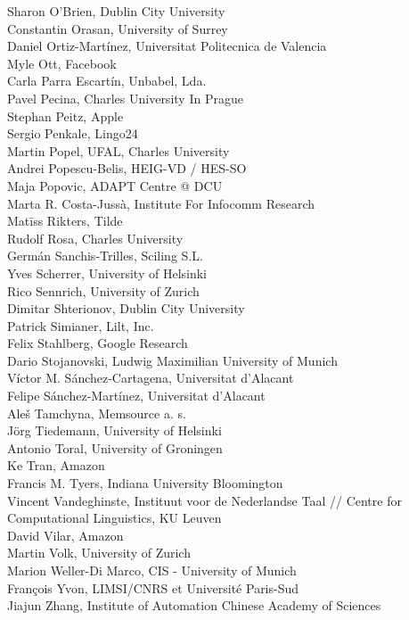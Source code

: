 \documentclass[a4paper,11pt,twoside]{book}
\begin{document}
\noindent Sharon O'Brien, Dublin City University\\
\noindent Constantin Orasan, University of Surrey\\
\noindent Daniel Ortiz-Martínez, Universitat Politecnica de Valencia\\
\noindent Myle Ott, Facebook\\
\noindent Carla Parra Escartín, Unbabel, Lda.\\
\noindent Pavel Pecina, Charles University In Prague\\
\noindent Stephan Peitz, Apple\\
\noindent Sergio Penkale, Lingo24\\
\noindent Martin Popel, UFAL, Charles University\\
\noindent Andrei Popescu-Belis, HEIG-VD / HES-SO\\
\noindent Maja Popovic, ADAPT Centre @ DCU\\
\noindent Marta R. Costa-Jussà, Institute For Infocomm Research\\
\noindent Matīss Rikters, Tilde\\
\noindent Rudolf Rosa, Charles University\\
\noindent Germán Sanchis-Trilles, Sciling S.L.\\
\noindent Yves Scherrer, University of Helsinki\\
\noindent Rico Sennrich, University of Zurich\\
\noindent Dimitar Shterionov, Dublin City University\\
\noindent Patrick Simianer, Lilt, Inc.\\
\noindent Felix Stahlberg, Google Research\\
\noindent Dario Stojanovski, Ludwig Maximilian University of Munich\\
\noindent Víctor M. Sánchez-Cartagena, Universitat d'Alacant\\
\noindent Felipe Sánchez-Martínez, Universitat d'Alacant\\
\noindent Aleš Tamchyna, Memsource a. s.\\
\noindent Jörg Tiedemann, University of Helsinki\\
\noindent Antonio Toral, University of Groningen\\
\noindent Ke Tran, Amazon\\
\noindent Francis M. Tyers, Indiana University Bloomington\\
\noindent Vincent Vandeghinste, Instituut voor de Nederlandse Taal // Centre for Computational Linguistics, KU Leuven\\
\noindent David Vilar, Amazon\\
\noindent Martin Volk, University of Zurich\\
\noindent Marion Weller-Di Marco, CIS - University of Munich\\
\noindent François Yvon, LIMSI/CNRS et Université Paris-Sud\\
\noindent Jiajun Zhang, Institute of Automation Chinese Academy of Sciences
\end{document}
